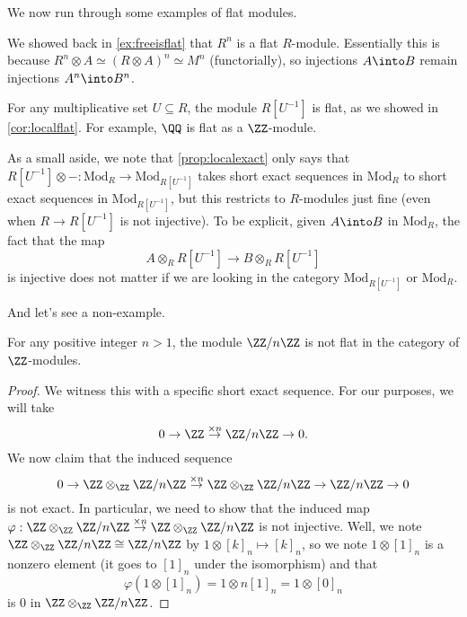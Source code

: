 We now run through some examples of flat modules.
\begin{example}
	We showed back in \autoref{ex:freeisflat} that $R^n$ is a flat $R$-module. Essentially this is because $R^n\otimes A\simeq(R\otimes A)^n\simeq M^n$ (functorially), so injections $A\into B$ remain injections $A^n\into B^n$.
\end{example}
\begin{example}
	For any multiplicative set $U\subseteq R$, the module $R\left[U^{-1}\right]$ is flat, as we showed in \autoref{cor:localflat}. For example, $\QQ$ is flat as a $\ZZ$-module.
\end{example}
\begin{remark}
	As a small aside, we note that \autoref{prop:localexact} only says that $R\left[U^{-1}\right]\otimes-:\mathrm{Mod}_R\to\mathrm{Mod}_{R\left[U^{-1}\right]}$ takes short exact sequences in $\mathrm{Mod}_R$ to short exact sequences in $\mathrm{Mod}_{R\left[U^{-1}\right]}$, but this restricts to $R$-modules just fine (even when $R\to R\left[U^{-1}\right]$ is not injective). To be explicit, given $A\into B$ in $\mathrm{Mod}_R$, the fact that the map
	\[A\otimes_RR\left[U^{-1}\right]\to B\otimes_RR\left[U^{-1}\right]\]
	is injective does not matter if we are looking in the category $\mathrm{Mod}_{R\left[U^{-1}\right]}$ or $\mathrm{Mod}_R$.
\end{remark}
And let's see a non-example.
\begin{exe}
	For any positive integer $n>1$, the module $\ZZ/n\ZZ$ is not flat in the category of $\ZZ$-modules.
\end{exe}
\begin{proof}
	We witness this with a specific short exact sequence. For our purposes, we will take
	\[0\to\ZZ\stackrel{\times n}\to\ZZ/n\ZZ\to0.\]
	We now claim that the induced sequence
	\[0\to\ZZ\otimes_\ZZ\ZZ/n\ZZ\stackrel{\times n}\to\ZZ\otimes_\ZZ\ZZ/n\ZZ\to\ZZ/n\ZZ\to0\]
	is not exact. In particular, we need to show that the induced map $\varphi:\ZZ\otimes_\ZZ\ZZ/n\ZZ\stackrel{\times n}\to\ZZ\otimes_\ZZ\ZZ/n\ZZ$ is not injective. Well, we note $\ZZ\otimes_\ZZ\ZZ/n\ZZ\cong\ZZ/n\ZZ$ by $1\otimes[k]_n\mapsto[k]_n$, so we note $1\otimes[1]_n$ is a nonzero element (it goes to $[1]_n$ under the isomorphism) and that
	\[\varphi(1\otimes[1]_n)=1\otimes n[1]_n=1\otimes[0]_n\]
	is $0$ in $\ZZ\otimes_\ZZ\ZZ/n\ZZ$.
\end{proof}

